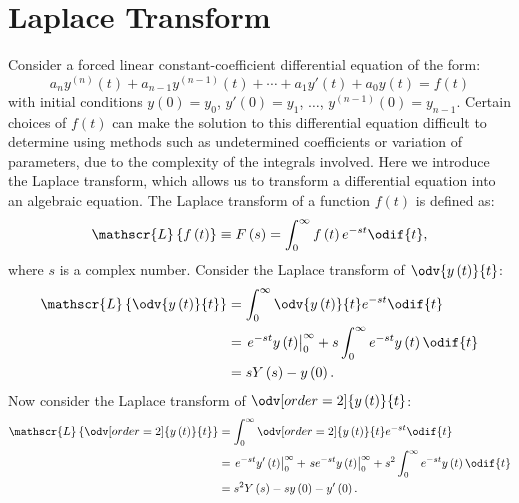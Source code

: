 \documentclass{article}
\begin{document}
\section{Laplace Transform}
Consider a forced linear constant-coefficient differential equation of
the form:
\begin{equation*}
    a_n y^{\left( n \right)}\left( t \right) + a_{n-1} y^{\left( n-1 \right)}\left( t \right) + \cdots + a_1 y'\left( t \right) + a_0 y\left( t \right) = f\left( t \right)
\end{equation*}
with initial conditions \(y\left( 0 \right) = y_0\), \(y'\left( 0 \right) = y_1\), \(\ldots\), \(y^{\left( n-1 \right)}\left( 0 \right) = y_{n-1}\).
Certain choices of \(f\left( t \right)\) can make the solution to this
differential equation difficult to determine using methods such as
undetermined coefficients or variation of parameters, due to the
complexity of the integrals involved. Here we introduce the Laplace
transform, which allows us to transform a differential equation into
an algebraic equation. The Laplace transform of a function
\(f\left( t \right)\) is defined as:
\begin{equation*}
    \mathscr{L}\left\{ f\left( t \right) \right\} \equiv F\left( s \right) = \int_0^\infty f\left( t \right) e^{-st} \odif{t},
\end{equation*}
where \(s\) is a complex number. Consider the Laplace transform of
\(\displaystyle \odv{y\left( t \right)}{t}\):
\begin{align*}
    \mathscr{L}\left\{ \odv{y\left( t \right)}{t} \right\} & = \int_0^\infty \odv{y\left( t \right)}{t} e^{-st} \odif{t}                                              \\
                                                           & = \left. e^{-st} y\left( t \right) \right|_0^\infty + s \int_0^\infty e^{-st} y\left( t \right) \odif{t} \\
                                                           & = s Y\left( s \right) - y\left( 0 \right).
\end{align*}
Now consider the Laplace transform of \(\displaystyle \odv[order=2]{y\left( t \right)}{t}\):
\begin{align*}
    \mathscr{L}\left\{ \odv[order=2]{y\left( t \right)}{t} \right\} & = \int_0^\infty \odv[order=2]{y\left( t \right)}{t} e^{-st} \odif{t}                                                                                              \\
                                                                    & = \left. e^{-st} y'\left( t \right) \right|_0^\infty + \left. s e^{-st} y\left( t \right) \right|_0^\infty + s^2 \int_0^\infty e^{-st} y\left( t \right) \odif{t} \\
                                                                    & = s^2 Y\left( s \right) - s y\left( 0 \right) - y'\left( 0 \right).
\end{align*}
\end{document}
